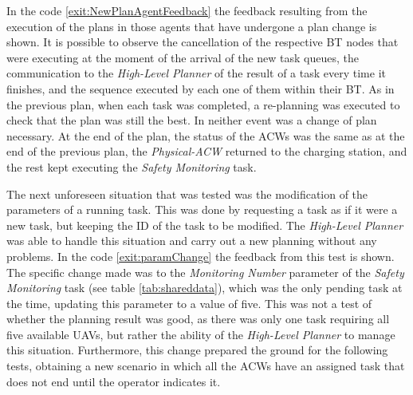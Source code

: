 In the code \ref{exit:NewPlanAgentFeedback} the feedback resulting from the execution of the plans in those agents that have undergone a plan change is shown. It is possible to observe the cancellation of the respective \gls{BT} nodes that were executing at the moment of the arrival of the new task queues, the communication to the \emph{High-Level Planner} of the result of a task every time it finishes, and the sequence executed by each one of them within their \gls{BT}. As in the previous plan, when each task was completed, a re-planning was executed to check that the plan was still the best. In neither event was a change of plan necessary. At the end of the plan, the status of the \glspl{ACW} was the same as at the end of the previous plan, the \emph{Physical-ACW} returned to the charging station, and the rest kept executing the \emph{Safety Monitoring} task.

The next unforeseen situation that was tested was the modification of the parameters of a running task. This was done by requesting a task as if it were a new task, but keeping the \gls{ID} of the task to be modified. The \emph{High-Level Planner} was able to handle this situation and carry out a new planning without any problems. In the code \ref{exit:paramChange} the feedback from this test is shown. The specific change made was to the \emph{Monitoring Number} parameter of the \emph{Safety Monitoring} task (see table \ref{tab:shareddata}), which was the only pending task at the time, updating this parameter to a value of five. This was not a test of whether the planning result was good, as there was only one task requiring all five available \glspl{UAV}, but rather the ability of the \emph{High-Level Planner} to manage this situation. Furthermore, this change prepared the ground for the following tests, obtaining a new scenario in which all the \glspl{ACW} have an assigned task that does not end until the operator indicates it.


